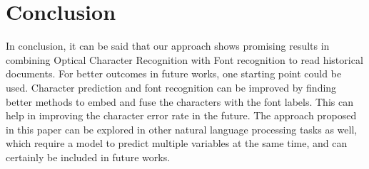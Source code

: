 \documentclass[conference]{IEEEtran}
\begin{document}
\newpage

\section{Conclusion}\label{conclusion}
In conclusion, it can be said that our approach shows promising results in combining Optical Character Recognition with Font recognition to read historical documents. For better outcomes in future works, one starting point could be used. Character prediction and font recognition can be improved by finding better methods to embed and fuse the characters with the font labels. This can help in improving the character error rate in the future. The approach proposed in this paper can be explored in other natural language processing tasks as well, which require a model to predict multiple variables at the same time, and can certainly be included in future works.





\end{document}
